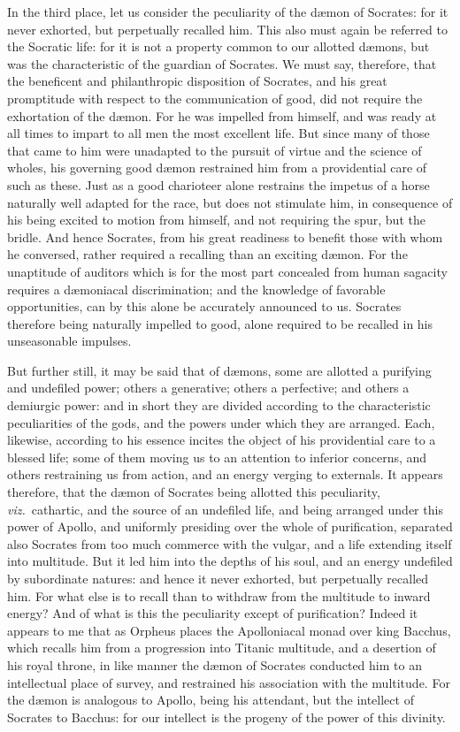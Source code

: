 \documentclass[12pt]{article}
\begin{document}
In the third place, let us consider the peculiarity of the d{\ae}mon of
Socrates: for it never exhorted, but perpetually recalled him. This also must
again be referred to the Socratic life: for it is not a property common to our
allotted d{\ae}mons, but was the characteristic of the guardian of Socrates. We
must say, therefore, that the beneficent and philanthropic disposition of
Socrates, and his great promptitude with respect to the communication of good,
did not require the exhortation of the d{\ae}mon. For he was impelled from
himself, and was ready at all times to impart to all men the most excellent
life. But since many of those that came to him were unadapted to the pursuit of
virtue and the science of wholes, his governing good d{\ae}mon restrained him
from a providential care of such as these. Just as a good charioteer alone
restrains the impetus of a horse naturally well adapted for the race, but does
not stimulate him, in consequence of his being excited to motion from himself,
and not requiring the spur, but the bridle. And hence Socrates, from his great
readiness to benefit those with whom he conversed, rather required a recalling
than an exciting d{\ae}mon. For the unaptitude of auditors which is for the
most part concealed from human sagacity requires a d{\ae}moniacal
discrimination; and the knowledge of favorable opportunities, can by this alone
be accurately announced to us. Socrates therefore being naturally impelled to
good, alone required to be recalled in his unseasonable impulses.

But further still, it may be said that of d{\ae}mons, some are allotted a
purifying and undefiled power; others a generative; others a perfective; and
others a demiurgic power: and in short they are divided according to the
characteristic peculiarities of the gods, and the powers under which they are
arranged. Each, likewise, according to his essence incites the object of his
providential care to a blessed life; some of them moving us to an attention to
inferior concerns, and others restraining us from action, and an energy verging
to externals. It appears therefore, that the d{\ae}mon of Socrates being
allotted this peculiarity, \textit{viz.}~cathartic, and the source of an
undefiled life, and being arranged under this power of Apollo, and uniformly
presiding over the whole of purification, separated also Socrates from too much
commerce with the vulgar, and a life extending itself into multitude. But it
led him into the depths of his soul, and an energy undefiled by subordinate
natures: and hence it never exhorted, but perpetually recalled him. For what
else is to recall than to withdraw from the multitude to inward energy? And of
what is this the peculiarity except of purification? Indeed it appears to me
that as Orpheus places the Apolloniacal monad over king Bacchus, which recalls
him from a progression into Titanic multitude, and a desertion of his royal
throne, in like manner the d{\ae}mon of Socrates conducted him to an
intellectual place of survey, and restrained his association with the
multitude. For the d{\ae}mon is analogous to Apollo, being his attendant, but
the intellect of Socrates to Bacchus: for our intellect is the progeny of the
power of this divinity.
\end{document}
